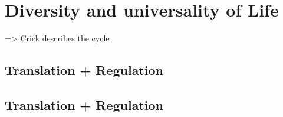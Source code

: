 \begin{comment}
\Rough{%
Gene expression, transcription, translation, regulation at each stage,
expected and reported correlation between transcripts and proteins
Measuring transcript expression by RNAseq, wet-lab part, analysis methods,
available large scale datasets on human tissues
Measuring protein expression by MS, data analysis – spectral counts, top 3, etc,
available large scale datasets on human tissues
The problem of comparing and integrating independent datasets, EBI’s GXA \\ \\
key concepts: DNA storage, RNA transfert of information and regulation,
protein effectors ==\textgreater phenotype.\\ \\
%
Do not forget the (tissues) specifications and the structural functions. =\textgreater Embryology.\\ \\
%
introduction real possible start: la soupe primaire -\textgreater creation de RNA, aa,
oeuf/poule
premiere cellule, \ldots (lire Darwin, il y a ptet moyen d ajouter une citation ou
quelque chose.%
}

\begin{itemize}
    \item Proteomics messy and noisy, challenging \ldots
    \item Transcriptomics seem a good proxy to study the phenotype => one kind of molecule made of the same pieces.
    \item Technology improved a lot from the microarrays to sequencing.
\end{itemize}

\end{comment}


\section{Diversity and universality of Life}



 => Crick describes the cycle


\subsection{Translation + Regulation}

\subsection{Translation + Regulation}

